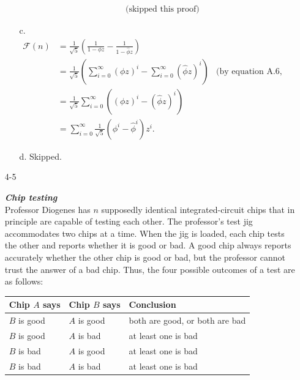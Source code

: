 \begin{enumerate}
\begin{framed}
\begin{enumerate}
\begin{equation*}
\begin{aligned}
                         & \text{(skipped this proof)}
        \end{aligned}
      \end{equation*}
    \item[c.]
      \begin{equation*}
        \begin{aligned}
          \mathcal{F}(n) &= \frac{1}{\sqrt 5} \left(\frac{1}{1 - \phi z} - \frac{1}{1 - \hat\phi z}\right)\\
                         &= \frac{1}{\sqrt 5} \left(\sum_{i = 0}^{\infty} (\phi z)^i - \sum_{i = 0}^{\infty} (\hat\phi z)^i\right)
                         & \text{(by equation A.6, geometric series)}\\
                         &= \frac{1}{\sqrt 5} \sum_{i = 0}^{\infty} \left( (\phi z)^i - (\hat\phi z)^i \right)\\
                         &= \sum_{i = 0}^{\infty} \frac{1}{\sqrt 5} (\phi^i - \hat\phi^i) z^i.
        \end{aligned}
      \end{equation*}
    \item[d.] Skipped.
  \end{enumerate}
\end{framed}

\newpage

\item[4{-}5]{\textbf{\emph{Chip testing}}\\
Professor Diogenes has $n$ supposedly identical integrated-circuit chips that in
principle are capable of testing each other. The professor's test jig
accommodates two chips at a time. When the jig is loaded, each chip tests the
other and reports whether it is good or bad. A good chip always reports
accurately whether the other chip is good or bad, but the professor cannot trust
the answer of a bad chip. Thus, the four possible outcomes of a test are as
follows:

\begin{tabular}{lll}
  Chip $A$ says & Chip $B$ says & Conclusion\\
  \toprule
  $B$ is good & $A$ is good & both are good, or both are bad\\
  $B$ is good & $A$ is bad  & at least one is bad\\
  $B$ is bad  & $A$ is good & at least one is bad\\
  $B$ is bad  & $A$ is bad  & at least one is bad
\end{tabular}

}
\end{enumerate}
